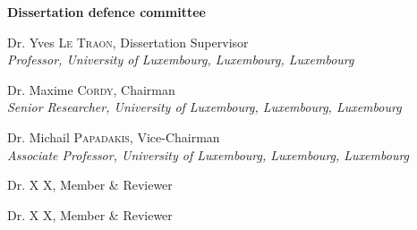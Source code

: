 \begin{adjustwidth*}{1em}{1em}

\noindent
\textbf{\large Dissertation defence committee}

\vspace{0.5cm}
\noindent
Dr. Yves \textsc{Le Traon}, Dissertation Supervisor\\
{\small \emph{Professor, University of Luxembourg, Luxembourg, Luxembourg}}

\vspace{0.3cm}
\noindent
Dr.  Maxime \textsc{Cordy}, Chairman\\
{\small \emph{Senior Researcher, University of Luxembourg, Luxembourg, Luxembourg}} 

\vspace{0.3cm}
\noindent
Dr. Michail \textsc{Papadakis}, Vice-Chairman\\
{\small \emph{Associate Professor, University of Luxembourg, Luxembourg, Luxembourg}}   

\vspace{0.3cm}
\noindent
Dr. X \textsc{X}, Member \& Reviewer\\
{\small \emph{}}

\vspace{0.3cm}
\noindent
Dr. X \textsc{X}, Member \& Reviewer\\
{\small \emph{}}

\end{adjustwidth*}

\restoregeometry